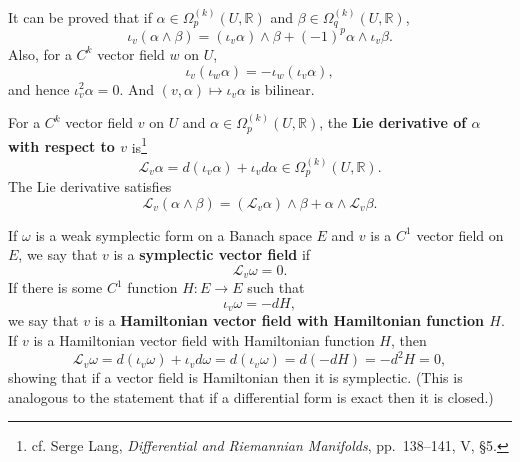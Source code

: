 \documentclass{article}
\theoremstyle{definition}
\theoremstyle{definition}
\begin{document}
It can be proved that if $\alpha \in \Omega_p^{(k)}(U,\mathbb{R})$
and $\beta \in \Omega_q^{(k)}(U,\mathbb{R})$,
\[
\iota_v(\alpha \wedge \beta) = (\iota_v \alpha) \wedge \beta + (-1)^p \alpha \wedge \iota_v \beta.
\]
Also, for a $C^k$ vector field $w$ on $U$,
\[
\iota_v(\iota_w \alpha) = - \iota_w(\iota_v \alpha),
\]
and hence $\iota_v^2 \alpha=0$. And $(v,\alpha) \mapsto \iota_v \alpha$ is bilinear.

For a $C^k$ vector field $v$ on $U$ and $\alpha \in \Omega_p^{(k)}(U,\mathbb{R})$, the \textbf{Lie
derivative of $\alpha$ with respect to $v$} is\footnote{cf. Serge Lang,
{\em Differential and Riemannian Manifolds}, pp.~138--141, V, \S 5.}
\[
\mathscr{L}_v \alpha  = d(\iota_v \alpha)+\iota_v d\alpha \in \Omega_p^{(k)}(U,\mathbb{R}).
\]
The Lie derivative satisfies 
\[
\mathscr{L}_v(\alpha \wedge \beta) = (\mathscr{L}_v \alpha) \wedge \beta + \alpha \wedge \mathscr{L}_v
\beta.
\]

If $\omega$ is a weak symplectic form on a Banach space $E$ and 
$v$ is a $C^1$ vector field on $E$,
we say that $v$ is a \textbf{symplectic vector field} if
\[
\mathscr{L}_v \omega = 0.
\]
If there is some $C^1$ function $H:E \to E$ such that
\[
\iota_v \omega = - dH,
\]
we say that $v$ is a \textbf{Hamiltonian vector field with Hamiltonian function $H$}.
If $v$ is a Hamiltonian vector field with Hamiltonian function $H$, then
\[
\mathscr{L}_v \omega = d(\iota_v \omega) + \iota_v d\omega
=d(\iota_v \omega)
=d(-dH)
=-d^2H=0,
\]
showing that if a vector field is Hamiltonian then it is symplectic. (This is analogous to the statement that if a differential form is exact
then it is closed.)
\end{document}

